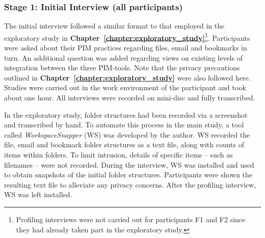 \subsubsection{Stage 1: Initial Interview (all participants)}
The initial interview followed a similar format to that employed in the exploratory study in \textbf{Chapter~\ref{chapter:exploratory_study}}\footnote{Profiling interviews were not carried out for participants F1 and F2 since they had already taken part in the exploratory study.}.  Participants were asked about their PIM practices regarding files, email and bookmarks in turn.   An additional question was added regarding views on existing levels of integration between the three PIM-tools.  Note that the privacy precautions outlined in \textbf{Chapter~\ref{chapter:exploratory_study}} were also followed here.
Studies were carried out in the work environment of the participant and took about one hour.  All interviews were recorded on mini-disc and fully transcribed.

In the exploratory study, folder structures had been recorded via a screenshot and transcribed by hand.  To automate this process in the main study, a tool called \textit{WorkspaceSnapper} (WS) was developed by the author.  WS recorded the file, email and bookmark folder structures as a text file, along with counts of items within folders.  To limit intrusion, details of specific items -- such as filenames -- were not recorded.  During the interview, WS was installed and used to obtain snapshots of the initial folder structures.  Participants were shown the resulting text file to alleviate any privacy concerns. After the profiling interview,  WS was left installed.





